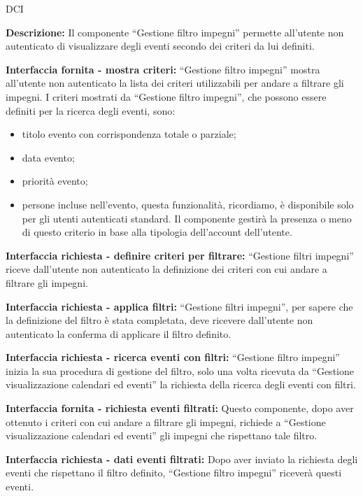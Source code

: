 \begin{listaPersonale}{DCI}

    \textbf{Descrizione:} Il componente “Gestione filtro impegni” permette all'utente non autenticato di visualizzare degli eventi secondo dei criteri da lui definiti.

    \textbf{Interfaccia fornita - mostra criteri:} “Gestione filtro impegni” mostra all'utente non autenticato la lista dei criteri utilizzabili per andare a filtrare gli impegni.
    I criteri mostrati da “Gestione filtro impegni”, che possono essere definiti per la ricerca degli eventi, sono:
    \begin{itemize}
        \item titolo evento con corrispondenza totale o parziale;
        \item data evento;
        \item priorità evento;
        \item persone incluse nell'evento, questa funzionalità, ricordiamo, è disponibile solo per gli utenti autenticati standard. Il componente gestirà la presenza o meno di questo criterio in base alla tipologia dell'account dell'utente.
    \end{itemize}

    \textbf{Interfaccia richiesta - definire criteri per filtrare:} “Gestione filtri impegni” riceve dall'utente non autenticato la definizione dei criteri con cui andare a filtrare gli impegni.

    \textbf{Interfaccia richiesta - applica filtri:} “Gestione filtri impegni”, per sapere che la definizione del filtro è stata completata, deve ricevere dall'utente non autenticato la conferma di applicare il filtro definito.

    \textbf{Interfaccia richiesta - ricerca eventi con filtri:} “Gestione filtro impegni” inizia la sua procedura di gestione del filtro, solo una volta ricevuta da “Gestione visualizzazione calendari ed eventi” la richiesta della ricerca degli eventi con filtri.

    \textbf{Interfaccia fornita - richiesta eventi filtrati:} Questo componente, dopo aver ottenuto i criteri con cui andare a filtrare gli impegni, richiede a “Gestione visualizzazione calendari ed eventi” gli impegni che rispettano tale filtro.

    \textbf{Interfaccia richiesta - dati eventi filtrati:} Dopo aver inviato la richiesta degli eventi che rispettano il filtro definito, “Gestione filtro impegni” riceverà questi eventi.


\end{listaPersonale}
